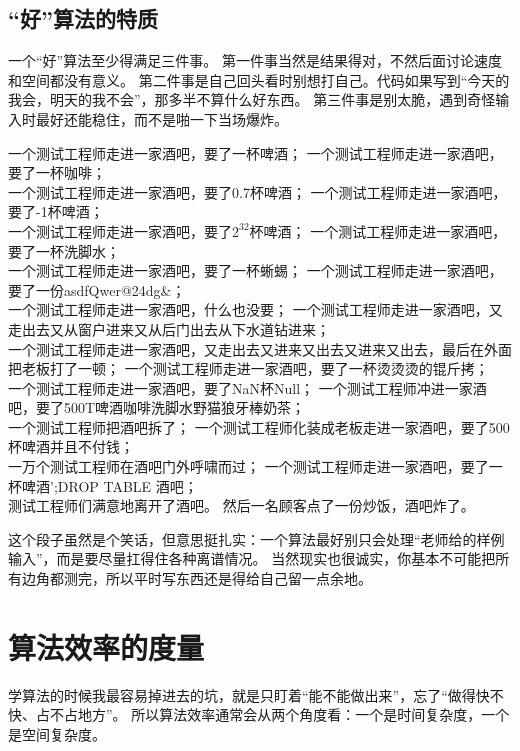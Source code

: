 \documentclass[b5paper,11pt]{article}
\begin{document}
\subsection{“好”算法的特质}
一个“好”算法至少得满足三件事。
第一件事当然是结果得对，不然后面讨论速度和空间都没有意义。
第二件事是自己回头看时别想打自己。代码如果写到“今天的我会，明天的我不会”，那多半不算什么好东西。
第三件事是别太脆，遇到奇怪输入时最好还能稳住，而不是啪一下当场爆炸。
\begin{cquote}\fontsize{7pt}{6pt}

  一个测试工程师走进一家酒吧，要了一杯啤酒；
  一个测试工程师走进一家酒吧，要了一杯咖啡；\\
  一个测试工程师走进一家酒吧，要了0.7杯啤酒；
  一个测试工程师走进一家酒吧，要了-1杯啤酒；\\
  一个测试工程师走进一家酒吧，要了$2^{32}$杯啤酒；
  一个测试工程师走进一家酒吧，要了一杯洗脚水；\\
  一个测试工程师走进一家酒吧，要了一杯蜥蜴；
  一个测试工程师走进一家酒吧，要了一份asdfQwer@24dg\!\&\*；\\
  一个测试工程师走进一家酒吧，什么也没要；
  一个测试工程师走进一家酒吧，又走出去又从窗户进来又从后门出去从下水道钻进来；\\
  一个测试工程师走进一家酒吧，又走出去又进来又出去又进来又出去，最后在外面把老板打了一顿；
  一个测试工程师走进一家酒吧，要了一杯烫烫烫的锟斤拷；\\
  一个测试工程师走进一家酒吧，要了NaN杯Null；
  一个测试工程师冲进一家酒吧，要了500T啤酒咖啡洗脚水野猫狼牙棒奶茶；\\
  一个测试工程师把酒吧拆了；
  一个测试工程师化装成老板走进一家酒吧，要了500杯啤酒并且不付钱；\\
  一万个测试工程师在酒吧门外呼啸而过；
  一个测试工程师走进一家酒吧，要了一杯啤酒';DROP TABLE 酒吧；\\
  测试工程师们满意地离开了酒吧。
  然后一名顾客点了一份炒饭，酒吧炸了。
\end{cquote}
这个段子虽然是个笑话，但意思挺扎实：一个算法最好别只会处理“老师给的样例输入”，而是要尽量扛得住各种离谱情况。
当然现实也很诚实，你基本不可能把所有边角都测完，所以平时写东西还是得给自己留一点余地。

\section{算法效率的度量}
学算法的时候我最容易掉进去的坑，就是只盯着“能不能做出来”，忘了“做得快不快、占不占地方”。
所以算法效率通常会从两个角度看：一个是时间复杂度，一个是空间复杂度。
\end{document}
